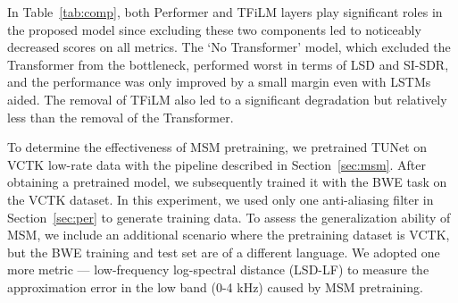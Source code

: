 \documentclass{article}
\begin{document}
In Table~\ref{tab:comp}, both Performer and TFiLM layers play significant roles in the proposed model since excluding these two components led to noticeably decreased scores on all metrics. The `No Transformer' model, which excluded the Transformer from the bottleneck, performed worst in terms of LSD and SI-SDR, and the performance was only improved by a small margin even with LSTMs aided. The removal of TFiLM also led to a significant degradation but relatively less than the removal of the Transformer.

\begin{table}
\centering
\caption{Effectiveness of components on our model.}
\label{tab:comp}
\end{table}





To determine the effectiveness of MSM pretraining, we pretrained TUNet on VCTK low-rate data with the pipeline described in Section~\ref{sec:msm}. After obtaining a pretrained model, we subsequently trained it with the BWE task on the VCTK dataset. In this experiment, we used only one anti-aliasing filter in Section~\ref{sec:per} to generate training data. To assess the generalization ability of MSM, we include an additional scenario where the pretraining dataset is VCTK, but the BWE training and test set are of a different language. We adopted one more metric --- low-frequency log-spectral distance (LSD-LF) to measure the approximation error in the low band (0-4 kHz) caused by MSM pretraining.
\end{document}
